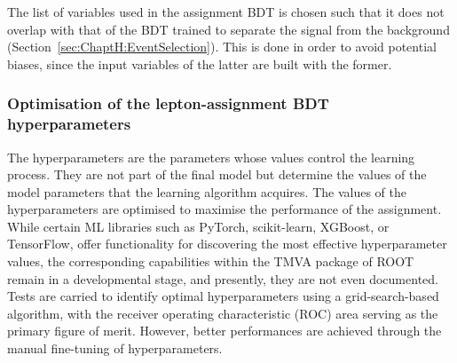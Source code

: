 
The list of variables used in the assignment BDT is chosen such that it does not overlap with that of the BDT 
trained to separate the signal from the background (Section~\ref{sec:ChaptH:EventSelection}). This is done in order
to avoid potential biases, since the input variables of the latter are built with the former.



\subsubsection{Optimisation of the lepton-assignment BDT hyperparameters}
\label{sec:ChaptH:Sig:LepAsign:SS:BDT:hyperparameters}
The hyperparameters are the parameters whose values control the learning process.
They are not part of the final model but determine the values of the model parameters that
the learning algorithm acquires. The values of the hyperparameters are optimised to maximise the 
performance of the assignment.
While certain ML libraries such as PyTorch, scikit-learn, XGBoost, or TensorFlow, 
offer functionality for discovering the most effective hyperparameter values, 
the corresponding capabilities within the TMVA  package of ROOT remain in a developmental stage, 
and presently, they are not even documented. Tests are carried to identify optimal 
hyperparameters using a grid-search-based algorithm, with the receiver operating characteristic (ROC) 
area serving as the primary figure of merit. 
However, better performances are achieved through the manual fine-tuning of hyperparameters.

